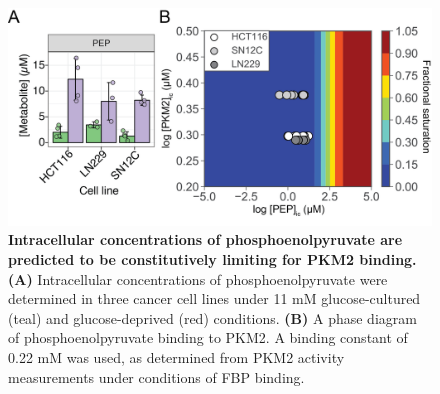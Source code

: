 %
%
%
%
%
%
\begin{figure}[!ht]
\includegraphics[scale=0.6]{ch4_fig12_pep_IC.png}
\caption[Intracellular concentrations of phosphoenolpyruvate are predicted to be constitutively limiting for PKM2 binding.] {\textbf{Intracellular concentrations of phosphoenolpyruvate are predicted to be constitutively limiting for PKM2 binding.} \textbf{(A)} Intracellular concentrations of phosphoenolpyruvate were determined in three cancer cell lines under 11 mM glucose-cultured (teal) and glucose-deprived (red) conditions. \textbf{(B)} A phase diagram of phosphoenolpyruvate binding to PKM2. A binding constant of 0.22 mM was used, as determined from PKM2 activity measurements under conditions of FBP binding.}
\label{fig:pep_conc}
\end{figure}
%
%
\clearpage

